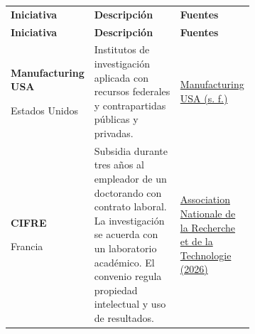 \begingroup
\small
{}
\setlength{\tabcolsep}{4pt}
\renewcommand{\arraystretch}{1.1}
\setlength{\LTpre}{4pt}
\setlength{\LTpost}{6pt}
\begin{longtable}{@{}>{\raggedright\arraybackslash}p{0.22\linewidth}>{\raggedright\arraybackslash}p{0.46\linewidth}>{\raggedright\arraybackslash}p{}@{}}
\multicolumn{3}{@{}l}{\textbf{Referentes internacionales}}\\[3pt]
\toprule
\textbf{Iniciativa} & \textbf{Descripción} & \textbf{Fuentes} \\
\midrule
\endfirsthead
\toprule
\textbf{Iniciativa} & \textbf{Descripción} & \textbf{Fuentes} \\
\midrule
\endhead
\bottomrule
\endfoot
\textbf{Manufacturing USA}\par Estados Unidos & Institutos de investigación aplicada con recursos federales y contrapartidas públicas y privadas. & \href{https://www.manufacturingusa.com/pages/manufacturing-usa-institute-model}{Manufacturing USA (s. f.)} \\
\addlinespace[5pt]
\textbf{CIFRE}\par Francia & Subsidia durante tres años al empleador de un doctorando con contrato laboral. La investigación se acuerda con un laboratorio académico. El convenio regula propiedad intelectual y uso de resultados. & \href{https://www.anrt.asso.fr/sites/default/files/2026-03/Cifre_2026.pdf}{Association Nationale de la Recherche et de la Technologie (2026)} \\
\end{longtable}
\endgroup


